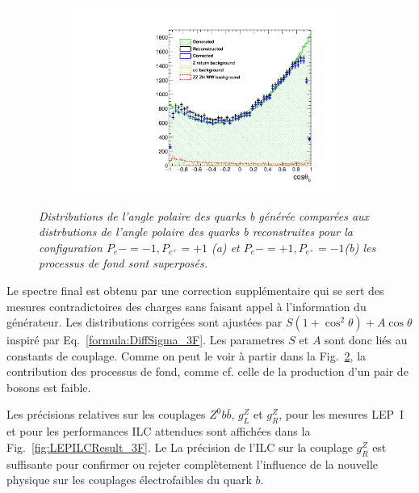 \begin{figure}
\begin{subfigure}{0.5\textwidth}
		\centering
		\includegraphics[width=0.95\textwidth]{ILD/plots/basymmetry-final-right.pdf}
		\caption{\label{fig:BAsymmetryFinal_b_3F} }
	\end{subfigure}
	\caption{\sl Distributions de l'angle polaire des quarks b générée comparées aux distrbutions de l'angle polaire des quarks b reconstruites pour la configuration $P_{e}-=-1, P_{e^+}=+1$ (a) et $P_{e}-=+1, P_{e^+}=-1$(b) les processus de fond sont superposés.}
	\label{fig:BAsymmetryFinal_3F}
\end{figure}

Le spectre final est obtenu par une correction supplémentaire qui se sert des mesures contradictoires des charges sans faisant appel à l'information du générateur.  %
Les distributions corrigées sont ajustées par $S(1+\cos^2\theta) + A\cos\theta$ inspiré par Eq.~\ref{formula:DiffSigma_3F}. Les parametres $S$ et $A$ sont donc liés au constants de couplage. 
Comme on peut le voir à partir dans la Fig.~\ref{fig:BAsymmetryFinal_3F}, la contribution des processus de fond, comme cf. celle de la production d'un pair de bosons est faible.


Les précisions relatives sur les couplages $Z^0 b\bar{b}$, $g_L^Z$ et $g_R^Z$, pour les mesures LEP~I et pour les performances ILC attendues sont affichées dans la Fig.~\ref{fig:LEPILCResult_3F}. Le 
La précision de l'ILC sur la couplage $g_R^Z$ est suffisante pour confirmer ou rejeter complètement l'influence de la nouvelle physique sur les couplages électrofaibles du quark $b$.

